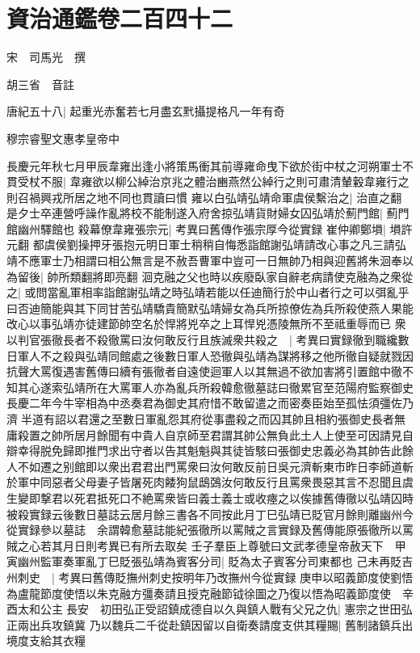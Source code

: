 \section{資治通鑑卷二百四十二}
宋　司馬光　撰

胡三省　音註

唐紀五十八|{
	起重光赤奮若七月盡玄黓攝提格凡一年有奇}


穆宗睿聖文惠孝皇帝中

長慶元年秋七月甲辰韋雍出逢小將策馬衝其前導雍命曳下欲於街中杖之河朔軍士不貫受杖不服|{
	韋雍欲以柳公綽治京兆之體治豳燕然公綽行之則可肅清輦轂韋雍行之則召禍興戎所居之地不同也貫讀曰慣}
雍以白弘靖弘靖命軍虞侯繫治之|{
	治直之翻}
是夕士卒連營呼譟作亂將校不能制遂入府舍掠弘靖貨財婦女囚弘靖於薊門館|{
	薊門館幽州驛館也}
殺幕僚韋雍張宗元|{
	考異曰舊傳作張宗厚今從實録}
崔仲卿鄭塤|{
	塤許元翻}
都虞侯劉操押牙張抱元明日軍士稍稍自悔悉詣館謝弘靖請改心事之凡三請弘靖不應軍士乃相謂曰相公無言是不赦吾曹軍中豈可一日無帥乃相與迎舊將朱洄奉以為留後|{
	帥所類翻將即亮翻}
洄克融之父也時以疾廢臥家自辭老病請使克融為之衆從之|{
	或問當亂軍相率詣館謝弘靖之時弘靖若能以任迪簡行於中山者行之可以弭亂乎曰否迪簡能與其下同甘苦弘靖驕貴簡默弘靖婦女為兵所掠僚佐為兵所殺使燕人果能改心以事弘靖亦徒建節帥空名於悍將兇卒之上耳悍兇憑陵無所不至祗重辱而已}
衆以判官張徹長者不殺徹罵曰汝何敢反行且族滅衆共殺之　|{
	考異曰實録徹到職纔數日軍人不之殺與弘靖同館處之後數日軍人恐徹與弘靖為謀將移之他所徹自疑就戮因抗聲大罵復遇害舊傳曰續有張徹者自遠使迴軍人以其無過不欲加害將引置館中徹不知其心遂索弘靖所在大罵軍人亦為亂兵所殺韓愈徹墓誌曰徹累官至范陽府監察御史長慶二年今牛宰相為中丞奏君為御史其府惜不敢留遣之而密奏臣始至孤怯須彊佐乃濟半道有詔以君還之至數日軍亂怨其府從事盡殺之而囚其帥且相約張御史長者無庸殺置之帥所居月餘聞有中貴人自京師至君謂其帥公無負此土人上使至可因請見自辯幸得脱免歸即推門求出守者以告其魁魁與其徒皆駭曰張御史忠義必為其帥告此餘人不如遷之别館即以衆出君君出門罵衆曰汝何敢反前日吳元濟斬東市昨日李師道斬於軍中同惡者父母妻子皆屠死肉餧狗鼠鴟鵶汝何敢反行且罵衆畏惡其言不忍聞且虞生變即撃君以死君抵死口不絶罵衆皆曰義士義士或收瘞之以俟據舊傳徹以弘靖囚時被殺實録云後數日墓誌云居月餘三書各不同按此月丁巳弘靖已貶官月餘則離幽州今從實録參以墓誌　余謂韓愈墓誌能紀張徹所以罵賊之言實録及舊傳能原張徹所以罵賊之心若其月日則考異已有所去取矣}
壬子羣臣上尊號曰文武孝德皇帝赦天下　甲寅幽州監軍奏軍亂丁巳貶張弘靖為賓客分司|{
	貶為太子賓客分司東都也}
己未再貶吉州刺史　|{
	考異曰舊傳貶撫州刺史按明年乃改撫州今從實録}
庚申以昭義節度使劉悟為盧龍節度使悟以朱克融方彊奏請且授克融節钺徐圖之乃復以悟為昭義節度使　辛酉太和公主長安　初田弘正受詔鎮成德自以久與鎮人戰有父兄之仇|{
	憲宗之世田弘正兩出兵攻鎮冀}
乃以魏兵二千從赴鎮因留以自衛奏請度支供其糧賜|{
	舊制諸鎮兵出境度支給其衣糧}

